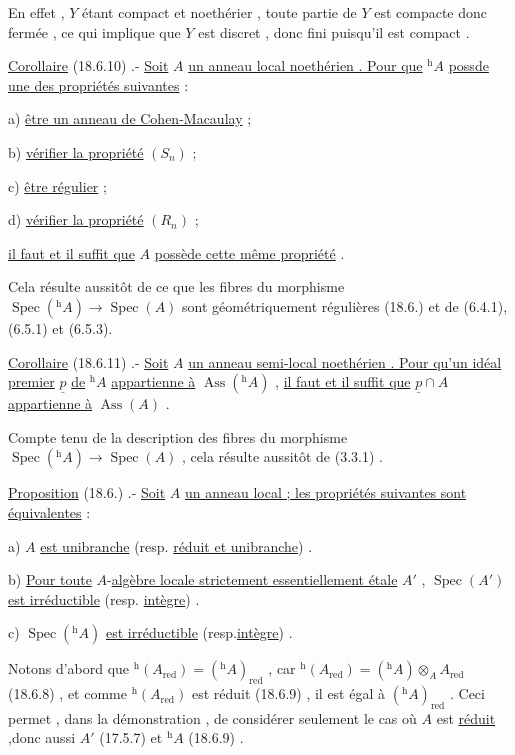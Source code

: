 En effet , $Y$ étant compact  et noethérier , toute partie de $Y$ est compacte\handwritten{,}
donc fermée , ce qui implique que $Y$ est discret , donc fini puisqu'il est
compact .

\uline{Corollaire} (18.6.10) .- \uline{Soit} $A$ \uline{un anneau local noethérien . Pour que} $ {}^{\mathrm h}A$ \uline{possde une des propriétés suivantes} :

a) \uline{être un anneau de Cohen-Macaulay} ;

b) \uline{vérifier la propriété} $(S_n)$ ;

c) \uline{être régulier} ;

d) \uline{vérifier la propriété} $(R_n)$ ;

\uline{il faut et il suffit que} $A$ \uline{possède cette même propriété} .

Cela résulte aussitôt de ce que les fibres du morphisme $\operatorname{Spec}({}^{\mathrm h}A)\to\operatorname{Spec}(A)$
sont géométriquement régulières (18.6.) et de (6.4.1),(6.5.1) et (6.5.3).

\uline{Corollaire} (18.6.11) .- \uline{Soit} $A$ \uline{un anneau semi-local noethérien . Pour qu'un
idéal premier} $\underline p$ \uline{de} $ {}^{\mathrm h}A$ \uline{appartienne à} $\operatorname{Ass}({}^{\mathrm h}A)$ , \uline{il faut et il suffit que} $\underline p\cap A$
\uline{appartienne à} $\operatorname{Ass}(A)$ .

Compte tenu de la description des fibres du morphisme $\operatorname{Spec}({}^{\mathrm h}A)\to\operatorname{Spec}(A)$ ,
cela résulte aussitôt de (3.3.1) .

\uline{Proposition} (18.6.) .- \uline{Soit} $A$ \uline{un anneau local ; les propriétés suivantes
sont équivalentes} :

a) $A$ \uline{est unibranche} (resp. \uline{réduit et unibranche}) .

b) \uline{Pour toute} $A$-\uline{algèbre locale strictement essentiellement étale} $A'$ ,
$\operatorname{Spec}(A')$ \uline{est irréductible} (resp. \uline{intègre}) .

c) $\operatorname{Spec}({}^{\mathrm h}A)$ \uline{est irréductible} (resp.\uline{intègre}) .

Notons d'abord que $ {}^{\mathrm h}(A_{\mathrm{red}})=({}^{\mathrm h}A)_{\mathrm{red}}$ , car  $ {}^{\mathrm h}(A_{\mathrm{red}})=({}^{\mathrm h}A)\otimes_A A_{\mathrm{red}}$ (18.6.8) , et
comme $ {}^{\mathrm h}(A_{\mathrm{red}})$ est réduit (18.6.9) , il est égal à $({}^{\mathrm h}A)_{\mathrm{red}}$ . Ceci permet ,
dans la démonstration , de considérer seulement le cas où $A$ est \uline{réduit} ,donc
aussi $A'$ (17.5.7) et $ {}^{\mathrm h}A$ (18.6.9) .

